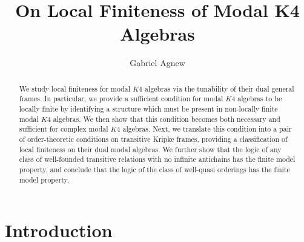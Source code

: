 \documentclass[submission]{eptcs}
\title{On Local Finiteness of Modal K4 Algebras}
\author{Gabriel Agnew
\institute{
New Mexico State University
\\
Las Cruces, United States}
\email{gvagnew@nmsu.edu}
}
\begin{document}
\maketitle

\begin{abstract}
We study local finiteness for modal $K4$ algebras via the tunability of their dual general frames.
In particular, we provide a sufficient condition for modal $K4$ algebras to be locally finite by identifying a structure which must be present in non-locally finite modal $K4$ algebras.
We then show that this condition becomes both necessary and sufficient for complex modal $K4$ algebras.
Next, we translate this condition into a pair of order-theoretic conditions on transitive Kripke frames, providing a classification of local finiteness on their dual modal algebras. 
We further show that the logic of any class of well-founded transitive relations with no infinite antichains has the finite model property, and conclude that the logic of the class of well-quasi orderings has the finite model property.
\end{abstract}

\section{Introduction}
\end{document}
